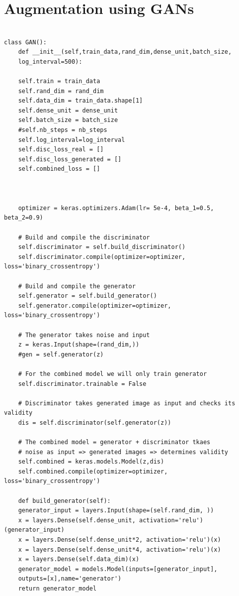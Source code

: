 \chapter{Augmentation using GANs}
\label{chapter:third-appendix}
\lstset{language=Python, caption=Implimentation of GANs,label=GAN}


\begin{lstlisting}

class GAN():
	def __init__(self,train_data,rand_dim,dense_unit,batch_size,
	log_interval=500):

	self.train = train_data
	self.rand_dim = rand_dim
	self.data_dim = train_data.shape[1]
	self.dense_unit = dense_unit 
	self.batch_size = batch_size
	#self.nb_steps = nb_steps
	self.log_interval=log_interval
	self.disc_loss_real = []
	self.disc_loss_generated = []
	self.combined_loss = []
	
	
	
	optimizer = keras.optimizers.Adam(lr= 5e-4, beta_1=0.5, beta_2=0.9)
	
	# Build and compile the discriminator
	self.discriminator = self.build_discriminator()
	self.discriminator.compile(optimizer=optimizer, loss='binary_crossentropy')
	
	# Build and compile the generator
	self.generator = self.build_generator()
	self.generator.compile(optimizer=optimizer, loss='binary_crossentropy')
	
	# The generator takes noise and input
	z = keras.Input(shape=(rand_dim,))
	#gen = self.generator(z)
	
	# For the combined model we will only train generator
	self.discriminator.trainable = False
	
	# Discriminator takes generated image as input and checks its validity
	dis = self.discriminator(self.generator(z))
	
	# The combined model = generator + discriminator tkaes
	# noise as input => generated images => determines validity
	self.combined = keras.models.Model(z,dis)
	self.combined.compile(optimizer=optimizer, loss='binary_crossentropy')
	
	def build_generator(self):
	generator_input = layers.Input(shape=(self.rand_dim, ))
	x = layers.Dense(self.dense_unit, activation='relu')(generator_input)
	x = layers.Dense(self.dense_unit*2, activation='relu')(x)
	x = layers.Dense(self.dense_unit*4, activation='relu')(x)
	x = layers.Dense(self.data_dim)(x)    
	generator_model = models.Model(inputs=[generator_input],
	outputs=[x],name='generator')
	return generator_model
	

\end{lstlisting}
